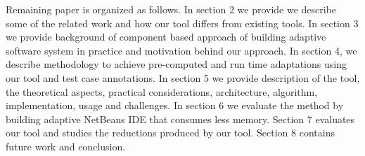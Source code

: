 Remaining paper is organized as follows. In section 2 we provide we describe some of the related work and how our tool differs from existing tools. In section 3 we provide background of component based approach of building adaptive software system in practice and motivation behind our approach. In section 4, we describe methodology to achieve pre-computed and run time adaptations using our tool and test case annotations. In section 5 we provide description of the tool, the theoretical aspects, practical considerations, architecture, algorithm, implementation, usage and challenges. In section 6 we evaluate the method by building adaptive NetBeans IDE that consumes less memory. Section 7 evaluates our tool and studies the reductions produced by our tool. Section 8 contains future work and conclusion.  

